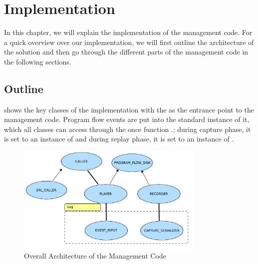 \section{Implementation}
In this chapter, we will explain the implementation of the management code. For a quick overview over our implementation, we will first outline the architecture of the solution and then go through the different parts of the management code in the following sections.


\subsection{Outline}
  shows the key classes of the implementation with the  as the entrance point to the management code. Program flow events are put into the standard instance of it, which all classes can access through the once function \hspace{0pt}.; during capture phase, it is set to an instance of  and during replay phase, it is set to an instance of .

\begin{figure}[ht]
  \centering
  \includegraphics[width=0.8\textwidth]{illustrations/implementation_overall_architecture}
  \caption{Overall Architecture of the Management Code}
  \label{fig:implementation_overall_architecture}
\end{figure}


